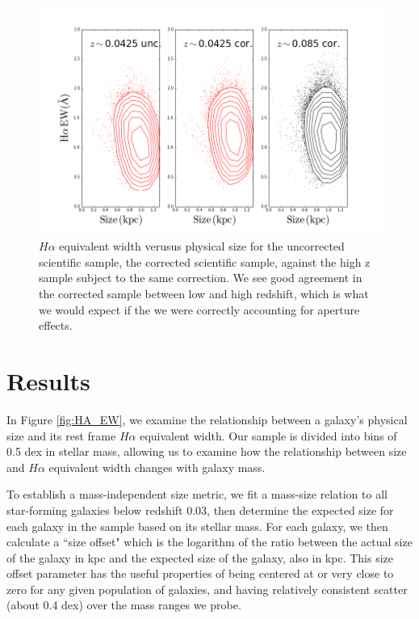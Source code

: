 \documentclass[iop]{emulateapj}
\begin{document}
\begin{figure}
	\centering
	\includegraphics[width=2 \columnwidth]{all_corrected_10_0.png}
	\caption{$H\alpha$ equivalent width verusus physical size for the uncorrected scientific sample, the corrected scientific sample, against the high z sample subject to the same correction. We see good agreement in the corrected sample between low and high redshift, which is what we would expect if the we were correctly accounting for aperture effects.}
     \label{fig:check}

\end{figure}


\section{Results}
\label{sec:results}

In Figure \ref{fig:HA_EW}, we examine the relationship between a galaxy's physical size and its rest frame $H\alpha$ equivalent width. Our sample is divided into bins of 0.5 dex in stellar mass, allowing us to examine how the relationship between size and $H\alpha$ equivalent width changes with galaxy mass.

To establish a mass-independent size metric, we fit a mass-size relation to all star-forming galaxies below redshift 0.03, then determine the expected size for each galaxy in the sample based on its stellar mass. For each galaxy, we then calculate a ``size offset" which is the logarithm of the ratio between the actual size of the galaxy in kpc and the expected size of the galaxy, also in kpc. This size offset parameter has the useful properties of being centered at or very close to zero for any given population of galaxies, and having relatively consistent scatter (about 0.4 dex) over the mass ranges we probe.
\end{document}
